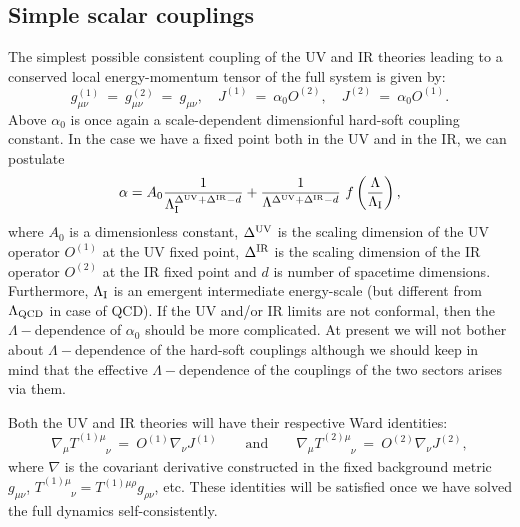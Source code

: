 \documentclass[prd,reprint,a4paper,showpacs,superscriptaddress,11pt,onecolumn,nofootinbib]{revtex4-1}
\renewcommand{\(}{\left(}
\renewcommand{\)}{\right)}
\newcommand{\6}{\partial}
\begin{document}
\subsection{Simple scalar couplings}
The simplest possible consistent coupling of the UV and IR theories leading to a conserved local energy-momentum tensor of the full system is given by:
\begin{equation}\label{eqn:teasercouplings}
g^{(1)}_{\mu\nu}  ~ = ~ g^{(2)}_{\mu\nu}  ~ = ~ g_{\mu\nu}, \quad J^{(1)} ~ = ~ \alpha_0 O^{(2)}, \quad J^{(2)} ~ = ~ \alpha_0 O^{(1)}.
\end{equation}
Above $\alpha_0$ is once again a scale-dependent dimensionful hard-soft coupling constant. In the case we have a fixed point both in the UV and in the IR, we can postulate
\begin{equation}\label{scale-dependence}
\alpha = A_0 \frac{1}{\Lambda_{\rm I}^{\Delta^{\rm UV} + \Delta^{\rm IR}- d}} + \frac{1}{\Lambda^{\Delta^{\rm UV} + \Delta^{\rm IR}- d}}\,\, f\left(\frac{\Lambda}{\Lambda_{\rm I}}\right),
\end{equation}
where $A_0$ is a dimensionless constant, $\Delta^{\rm UV}$ is the scaling dimension of the UV operator $O^{(1)}$ at the UV fixed point, $\Delta^{\rm IR}$ is the scaling dimension of the IR operator $O^{(2)}$ at the IR fixed point and $d$ is number of spacetime dimensions. Furthermore, $\Lambda_{\rm I}$ is an emergent intermediate energy-scale (but different from $\Lambda_{\rm QCD}$ in case of QCD). If the UV and/or IR limits are not conformal, then the $\Lambda-$dependence of $\alpha_0$ should be more complicated. At present we will not bother about $\Lambda-$dependence of the hard-soft couplings although we should keep in mind that the effective $\Lambda-$dependence of the couplings of the two sectors arises via them.

Both the UV and IR theories will have their respective Ward identities:
\begin{equation}\label{WIs}
\nabla_\mu T^{(1)\mu}_{\phantom{(1)\mu}\nu} ~ = ~ O^{(1)}\nabla_\nu J^{(1)} \qquad \text{and} \qquad \nabla_\mu T^{(2)\mu}_{\phantom{(2)\mu}\nu} ~ = ~ O^{(2)}\nabla_\nu J^{(2)},
\end{equation}
where $\nabla$ is the covariant derivative constructed in the fixed background metric $g_{\mu\nu}$, $T^{(1)\mu}_{\phantom{(1)\mu}\nu}= T^{(1)\mu\rho}g_{\rho\nu}$, etc. These identities will be satisfied once we have solved the full dynamics self-consistently. 
\end{document}
